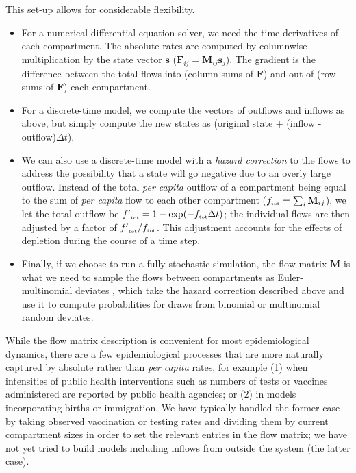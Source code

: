 \documentclass[12pt]{article}\usepackage[]{graphicx}\usepackage[]{color}
\begin{document}
This set-up allows for considerable flexibility.
\begin{itemize}
\item For a numerical differential equation solver, we need the time derivatives of each compartment. The absolute rates are computed by columnwise multiplication by the state vector $\mathbf s$ (${\mathbf F}_{ij} = \mathbf{M}_{ij} \mathbf{s}_j$).
The gradient is the difference between the total flows into (column sums of $\mathbf F$) and out of (row sums of $\mathbf F$) each compartment.
\item For a discrete-time model, we compute the vectors of outflows and inflows as above, but simply compute the new states as (original state + (inflow - outflow)$\Delta t$).
\item We can also use a discrete-time model with a \emph{hazard correction} to the flows to address the possibility that a state will go negative due to an overly large outflow. Instead of the total \emph{per capita} outflow of a compartment being equal to the sum of \emph{per capita} flow to each other compartment (${{f}_{\textrm{\tiny tot}}} = \sum_i {\mathbf M}_{ij}$), we let the total outflow be ${{f'}_{\textrm{\tiny tot}}} = 1-\exp(-{{f}_{\textrm{\tiny tot}}} \Delta t)$; the individual flows are then adjusted by a factor of ${{f'}_{\textrm{\tiny tot}}}/{{f}_{\textrm{\tiny tot}}}$.
This adjustment accounts for the effects of depletion during the course of a time step.
\item Finally, if we choose to run a fully stochastic simulation, the flow matrix $\mathbf M$ is what we need to sample the flows between compartments as Euler-multinomial deviates \cite{breto+09}, which take the hazard correction described above and use it to compute probabilities for draws from binomial or multinomial random deviates.
\end{itemize}

While the flow matrix description is convenient for most epidemiological dynamics, there are a few epidemiological processes that are more naturally captured by absolute rather than \emph{per capita} rates, for example (1) when intensities of public health interventions such as numbers of tests or vaccines administered are reported by public health agencies; or (2) in models incorporating births or immigration.
We have typically handled the former case by taking observed vaccination or testing rates and dividing them by current compartment sizes in order to set the relevant entries in the flow matrix; we have not yet tried to build models including inflows from outside the system (the latter case).
\end{document}
